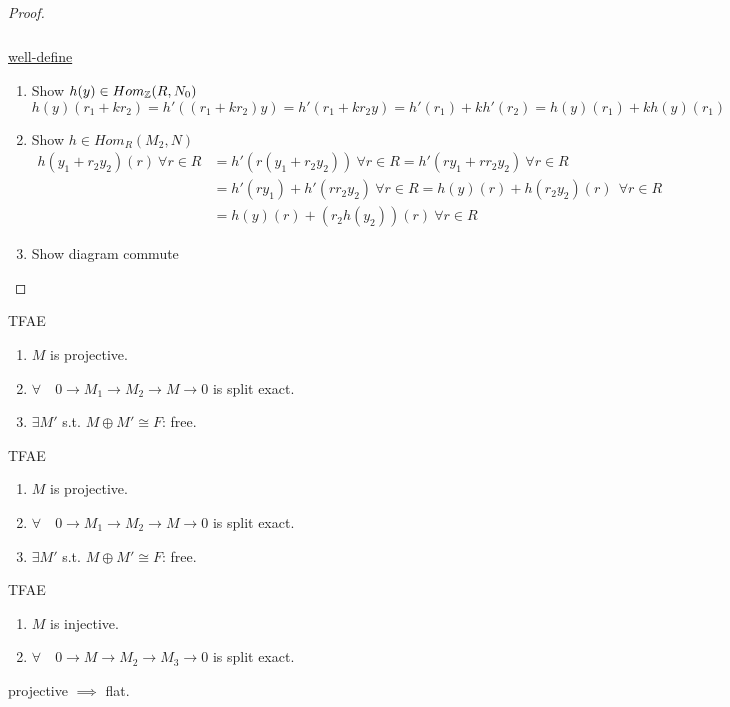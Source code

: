 \begin{theorem}
\begin{proof}
\begin{itemize}
$$\begin{tikzcd}[row sep=0.1]
        \end{tikzcd}
        $$
        \underline{well-define}
        \begin{enumerate}
          \item Show $h(y) \in Hom_{\mathbb{Z}}(R, N_0)$
            $$
              h(y)(r_1 + k r_2) = h'((r_1 + k r_2) y) = h'(r_1 + k r_2y) 
              = h'(r_1) + k h'(r_2) = h(y)(r_1) + k h(y)(r_1)
            $$
          \item Show $h \in Hom_R(M_2, N)$
            $$
              \begin{aligned}
                h(y_1 + r_2y_2)(r) \ \forall r \in R &= h'(r (y_1 + 
                r_2y_2)) \ \forall r \in R 
                = h'(ry_1 + rr_2y_2) \ \forall r \in R \\
                &= h'(ry_1) + h'(rr_2y_2) \ \forall r \in R 
                = h(y)(r) + h(r_2y_2)(r) \ \ \forall r \in R \\
                &= h(y)(r) + (r_2h(y_2))(r) \ \forall r \in R
              \end{aligned}
            $$
          \item Show diagram commute
            $$
            $$
        \end{enumerate}
  \end{itemize}
 \end{proof}
\end{theorem}

\begin{prop}
  TFAE
  \begin{enumerate}
    \item $M$ is projective.
    \item $\forall \quad 0 \to M_1 \to M_2 \to M \to 0$ is split exact.
    \item $\exists M'$ s.t. $M \oplus M' \cong F$: free.
  \end{enumerate}
\end{prop}

\begin{prop}
  TFAE
  \begin{enumerate}
    \item $M$ is projective.
    \item $\forall \quad 0 \to M_1 \to M_2 \to M \to 0$ is split exact.
    \item $\exists M'$ s.t. $M \oplus M' \cong F$: free.
  \end{enumerate}
\end{prop}

\begin{prop}
  TFAE
  \begin{enumerate}
    \item $M$ is injective.
    \item $\forall \quad 0 \to M \to M_2 \to M_3 \to 0$ is split exact.
  \end{enumerate}
\end{prop}

\begin{prop}
  projective $\implies$ flat.
\end{prop}


